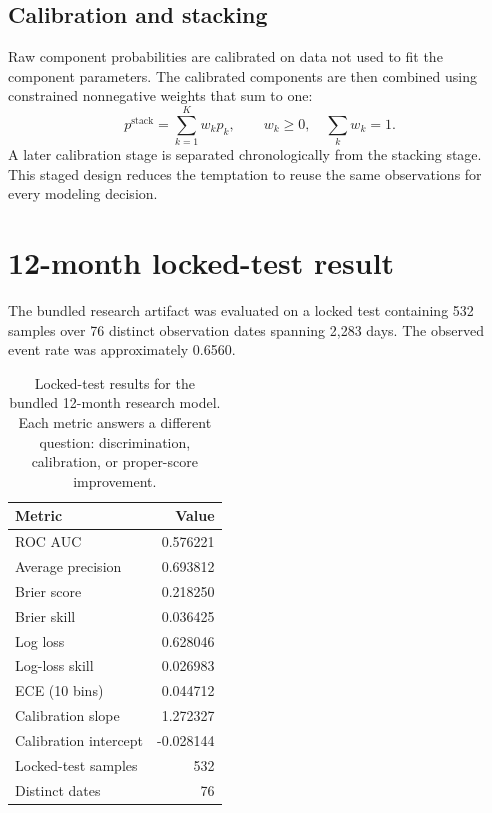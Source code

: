 \documentclass[11pt]{article}
\begin{document}
\subsection{Calibration and stacking}

Raw component probabilities are calibrated on data not used to fit the component parameters. The calibrated components are then combined using constrained nonnegative weights that sum to one:
\begin{equation}
p^{\text{stack}}=\sum_{k=1}^{K}w_k p_k,\qquad w_k\ge0,\quad \sum_k w_k=1.
\end{equation}
A later calibration stage is separated chronologically from the stacking stage. This staged design reduces the temptation to reuse the same observations for every modeling decision.

\section{12-month locked-test result}

The bundled research artifact was evaluated on a locked test containing 532 samples over 76 distinct observation dates spanning 2,283 days. The observed event rate was approximately 0.6560.

\begin{table}[tbp]
\centering
\small
\caption{Locked-test results for the bundled 12-month research model. Each metric answers a different question: discrimination, calibration, or proper-score improvement.}
\label{tab:realmetricsguide}
\begin{tabular}{@{}lr@{}}
\toprule
Metric & Value \\
\midrule
ROC AUC & 0.576221 \\
Average precision & 0.693812 \\
Brier score & 0.218250 \\
Brier skill & 0.036425 \\
Log loss & 0.628046 \\
Log-loss skill & 0.026983 \\
ECE (10 bins) & 0.044712 \\
Calibration slope & 1.272327 \\
Calibration intercept & -0.028144 \\
Locked-test samples & 532 \\
Distinct dates & 76 \\
\bottomrule
\end{tabular}
\end{table}
\end{document}
